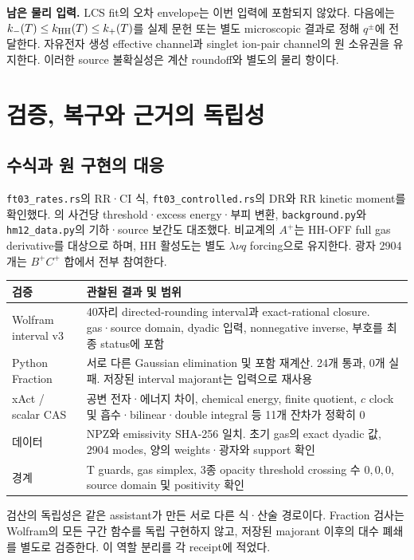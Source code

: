 \documentclass[11pt,a4paper]{article}
\numberwithin{equation}{section}
\begin{document}
\textbf{남은 물리 입력.} LCS fit의 오차 envelope는 이번 입력에 포함되지 않았다. 다음에는 $k_-(T)\le k_{\mathrm{HH}}(T)\le k_+(T)$를 실제 문헌 또는 별도 microscopic 결과로 정해 $q^\pm$에 전달한다. 자유전자 생성 effective channel과 singlet ion-pair channel의 원 소유권을 유지한다. 이러한 source 불확실성은 계산 roundoff와 별도의 물리 항이다.

\newpage
\section{검증, 복구와 근거의 독립성}
\subsection*{수식과 원 구현의 대응}
\texttt{ft03\_rates.rs}의 RR·CI 식, \texttt{ft03\_controlled.rs}의 DR와 RR kinetic moment를 확인했다. 의 사건당 threshold·excess energy·부피 변환, \texttt{background.py}와 \texttt{hm12\_data.py}의 기하·source 보간도 대조했다. 비교계의 $A^+$는 HH-OFF full gas derivative를 대상으로 하며, HH 활성도는 별도 $\lambda\nu q$ forcing으로 유지한다. 광자 2904개는 $B^+C^+$ 합에서 전부 참여한다.

\begin{center}
\begin{tabularx}{\linewidth}{@{}lX@{}}\toprule
검증 & 관찰된 결과 및 범위\\\midrule
Wolfram interval v3 & 40자리 directed-rounding interval과 exact-rational closure. gas·source domain, dyadic 입력, nonnegative inverse, 부호를 최종 status에 포함\\
Python Fraction & 서로 다른 Gaussian elimination 및 포함 재계산. 24개 통과, 0개 실패. 저장된 interval majorant는 입력으로 재사용\\
xAct / scalar CAS & 공변 전자·에너지 차이, chemical energy, finite quotient, $c$ clock 및 흡수·bilinear·double integral 등 11개 잔차가 정확히 0\\
데이터 & NPZ와 emissivity SHA-256 일치. 초기 gas의 exact dyadic 값, 2904 modes, 양의 weights·광자와 support 확인\\
경계 & T guards, gas simplex, 3종 opacity threshold crossing 수 $0,0,0$, source domain 및 positivity 확인\\\bottomrule
\end{tabularx}
\end{center}
검산의 독립성은 같은 assistant가 만든 서로 다른 식·산술 경로이다. Fraction 검사는 Wolfram의 모든 구간 함수를 독립 구현하지 않고, 저장된 majorant 이후의 대수 폐쇄를 별도로 검증한다. 이 역할 분리를 각 receipt에 적었다.
\end{document}
